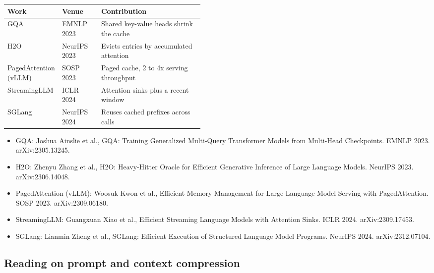 \begin{center}\footnotesize
\begin{tabularx}{\linewidth}{L{0.26\linewidth}L{0.2\linewidth}X}
\toprule
\textbf{Work} & \textbf{Venue} & \textbf{Contribution} \\
\midrule
GQA & EMNLP 2023 & Shared key-value heads shrink the cache \\
H2O & NeurIPS 2023 & Evicts entries by accumulated attention \\
PagedAttention (vLLM) & SOSP 2023 & Paged cache, 2 to 4x serving throughput \\
StreamingLLM & ICLR 2024 & Attention sinks plus a recent window \\
SGLang & NeurIPS 2024 & Reuses cached prefixes across calls \\
\bottomrule
\end{tabularx}
\end{center}

\begin{itemize}[leftmargin=*]
\item GQA: Joshua Ainslie et al., GQA: Training Generalized Multi-Query Transformer Models from Multi-Head Checkpoints. EMNLP 2023. arXiv:2305.13245.
\item H2O: Zhenyu Zhang et al., H2O: Heavy-Hitter Oracle for Efficient Generative Inference of Large Language Models. NeurIPS 2023. arXiv:2306.14048.
\item PagedAttention (vLLM): Woosuk Kwon et al., Efficient Memory Management for Large Language Model Serving with PagedAttention. SOSP 2023. arXiv:2309.06180.
\item StreamingLLM: Guangxuan Xiao et al., Efficient Streaming Language Models with Attention Sinks. ICLR 2024. arXiv:2309.17453.
\item SGLang: Lianmin Zheng et al., SGLang: Efficient Execution of Structured Language Model Programs. NeurIPS 2024. arXiv:2312.07104.
\end{itemize}

\subsection{Reading on prompt and context compression}
\label{sec:it-R-compress}

